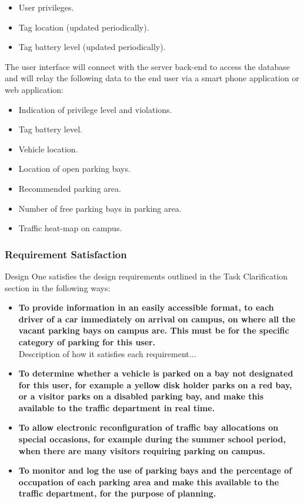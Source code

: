 \begin{itemize}
\item User privileges.
\item Tag location (updated periodically).
\item Tag battery level (updated periodically).
\end{itemize}

The user interface will connect with the server back-end to access the database and will relay the following data to the end user via a smart phone application or web application: 
\begin{itemize}
\item Indication of privilege level and violations.
\item Tag battery level.
\item Vehicle location.
\item Location of open parking bays.
\item Recommended parking area.
\item Number of free parking bays in parking area.
\item Traffic heat-map on campus.
\end{itemize}

\subsubsection{Requirement Satisfaction\cite{assignment}}
Design One satisfies the design requirements outlined in the Task Clarification section in the following ways:

\begin{itemize}
\item \textbf{To provide information in an easily accessible format, to each driver of a car immediately on arrival on campus, on where all the vacant parking bays on campus are. This must be for the specific category of parking for this user.}\\
Description of how it satisfies each requirement...

\item \textbf{To determine whether a vehicle is parked on a bay not designated for this user, for example a yellow disk holder parks on a red bay, or a visitor parks on a disabled parking bay, and make this available to the traffic department in real time.}\\

\item \textbf{To allow electronic reconfiguration  of  traffic  bay allocations on special occasions, for example during the summer school period, when there are many visitors requiring parking on campus.}\\

\item \textbf{To monitor and log the use of parking bays and the percentage of occupation of each parking area and make this available to the traffic department, for the purpose of planning.}\\
\end{itemize}

